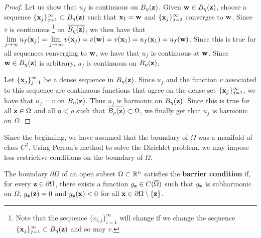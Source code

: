 \begin{proof}
 Let us show that $u_f$ is continuous on $B_\eta(\mathbf{z})$.
Given $\mathbf{w} \in B_\eta(\mathbf{z})$, choose a sequence
$\displaystyle \{\mathbf{x}_j\}_{j=1}^\infty \subset B_\eta(\mathbf{z})$
such that $\mathbf{x}_1 = \mathbf{w}$ and $\displaystyle \{\mathbf{x}_j\}_{j=2}^\infty$
converges to $\mathbf{w}$.  Since $v$ is continuous \footnote{Note that
the sequence $\displaystyle \{v_{i,j}\}_{i=1}^\infty$ will change if
we change the sequence
$\displaystyle \{\mathbf{x}_j\}_{j=1}^\infty \subset B_\eta(\mathbf{z})$ and
so may $v$.} on $\overline{B_\eta(\mathbf{z})}$, we then have that
$\displaystyle \lim_{j\to \infty} u_f(\mathbf{x}_j)
= \lim_{j\to \infty} v(\mathbf{x}_j) = v(\mathbf{w}) = v(\mathbf{x}_1) = 
u_f(\mathbf{x}_1) = u_f(\mathbf{w})$.
Since this is true for all sequences converging to $\mathbf{w}$, we have
that $u_f$ is continuous at $\mathbf{w}$.  Since $\mathbf{w} \in B_\eta(\mathbf{z})$
is arbitrary, $u_f$ is continuous on $B_\eta(\mathbf{z})$.

Let $\displaystyle \{\mathbf{x}_j\}_{j=1}^\infty$ be a dense sequence in 
$B_\eta(\mathbf{z})$.  Since $u_f$ and the function $v$ associated to
this sequence are continuous functions that agree on the dense set
$\displaystyle \{\mathbf{x}_j\}_{j=1}^\infty$, we have that
$u_f = v$ on $B_\eta(\mathbf{z})$.  Thus $u_f$ is harmonic on
$B_\eta(\mathbf{z})$.  Since this is true for all $\mathbf{z} \in \Omega$
and all $\eta < \rho$ such that $\overline{B_\rho(\mathbf{z})} \subset
\Omega$, we finally get that $u_f$ is harmonic on $\Omega$.
\end{proof}

Since the beginning, we have assumed that the boundary of $\Omega$ was
a manifold of class $C^2$.  Using Perron's method to solve the Dirichlet
problem, we may impose less restrictive conditions on the boundary of
$\Omega$.

\begin{defn}
The boundary $\partial \Omega$ of an open subset $\Omega \subset \mathbb{R}^n$
satisfies the {\bfseries barrier condition}
if, for every $\mathbf{z} \in \partial \Omega$, there exists a function
$g_{\mathbf{z}} \in C(\overline{\Omega})$ such that
$g_{\mathbf{z}}$ is subharmonic on $\Omega$, $g_{\mathbf{z}}(\mathbf{z}) = 0$
and $g_{\mathbf{z}}(\mathbf{x}) < 0$ for all
$\mathbf{x} \in \partial \Omega \setminus \{\mathbf{z}\}$.
\end{defn}

